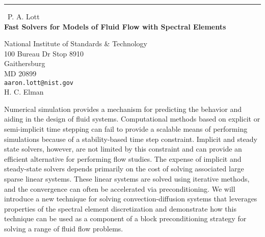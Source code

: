 \documentclass{report}
\begin{document}
\begin{center}
\rule{6in}{1pt} \
{\large P. A. Lott \\
{\bf Fast Solvers for Models of Fluid Flow with Spectral Elements}}

National Institute of Standards & Technology \\ 100 Bureau Dr Stop 8910 \\ Gaithersburg \\ MD 20899
\\
{\tt aaron.lott@nist.gov}\\
H. C. Elman\end{center}

Numerical simulation provides a mechanism for predicting the behavior and
aiding in the design of fluid systems. Computational methods based on
explicit or semi-implicit time stepping can fail to provide a scalable
means of performing simulations because of a stability-based time step
constraint. Implicit and steady state solvers, however, are not limited
by this constraint and can provide an efficient alternative for
performing flow studies. The expense of implicit and steady-state solvers
depends primarily on the cost of solving associated large sparse linear
systems. These linear systems are solved using iterative methods, and the
convergence can often be accelerated via preconditioning. We will
introduce a new technique for solving convection-diffusion systems that
leverages properties of the spectral element discretization and
demonstrate how this technique can be used as a component of a block
preconditioning strategy for solving a range of fluid flow problems.
\end{document}
